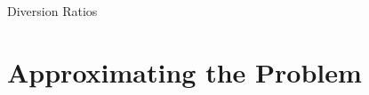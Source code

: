 \documentclass[aspectratio=169,10pt]{beamer}
\begin{document}
\begin{frame}{Diversion Ratios}
\begin{center}
\scalebox{0.6}{

}
\end{center}
\end{frame}


\section{Approximating the Problem}
\end{document}
